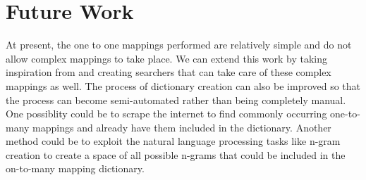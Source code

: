 \documentclass[conference]{IEEEtran}
\begin{document}
\section{Future Work}
At present, the one to one mappings performed are relatively simple and do not allow complex mappings to take place. We can extend this work by taking inspiration from \cite{ref5} and creating searchers that can take care of these complex mappings as well. The process of dictionary creation can also be improved so that the process can become semi-automated rather than being completely manual. One possiblity could be to scrape the internet to find commonly occurring one-to-many mappings and already have them included in the dictionary. Another method could be to exploit the natural language processing tasks like n-gram creation to create a space of all possible n-grams that could be included in the on-to-many mapping dictionary. 



%
%



%
%
\end{document}
